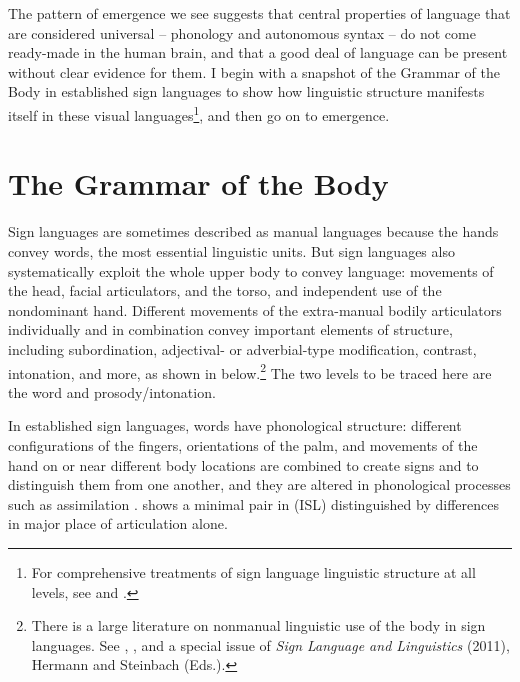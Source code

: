 \documentclass[output=paper]{langsci/langscibook}
\begin{document}
\largerpage[-2]
  The pattern of emergence we see suggests that central properties of language that are considered universal – phonology and autonomous syntax -- do not come ready-made in the human brain, and that a good deal of language can be present without clear evidence for them.  I begin with a snapshot of the Grammar of the Body in established sign languages to show how linguistic structure manifests itself in these visual languages\footnote{For comprehensive treatments of sign language linguistic structure at all levels, see \citet{Sandler2006} and \citet{Pfau2012}.     }, and then go on to emergence.{ }

\section{The Grammar of the Body}

  Sign languages are sometimes described as manual languages because the hands convey words, the most essential linguistic units.  But sign languages also systematically exploit the whole upper body to convey language:  movements of the head, facial articulators, and the torso, and independent use of the nondominant hand.  Different movements of the extra-manual bodily articulators individually and in combination convey important elements of structure, including subordination, adjectival- or adverbial-type modification, contrast, intonation, and more, as shown in  below.\footnote{There is a large literature on nonmanual linguistic use of the body in sign languages.  See \citet{Pfau2010}, \citet{Sandler2012b}, and a special issue of \textit{Sign Language and Linguistics }(2011), Hermann and Steinbach (Eds.).}  The two levels to be traced here are the word and prosody/intonation.  

  In established sign languages, words have phonological structure: different configurations of the fingers, orientations of the palm, and movements of the hand on or near different body locations are combined to create signs and to distinguish them from one another, and they are altered in phonological processes such as assimilation \citep{Stokoe1960,Sandler1989,Liddell1989,Brentari1998}.   shows a minimal pair in  (ISL) distinguished by differences in major place of articulation alone.
\end{document}
